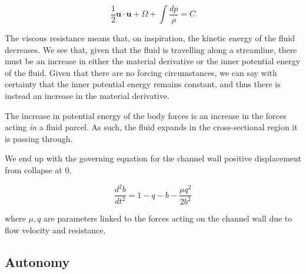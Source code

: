\documentclass{article}
\begin{document}
\begin{equation}
    \frac{1}{2}\mathbf{u}\cdot\mathbf{u} + \Omega + \int\frac{dp}{\rho} = C
    \label{eqn:bernoulli}
\end{equation}

The viscous resistance means that, on inspiration,
the kinetic energy of the fluid decreases.
We see that, given that the fluid is travelling along a streamline,
there must be an increase in either the material derivative or the inner potential energy of the fluid.
Given that there are no forcing circumstances,
we can say with certainty that the inner potential energy remains constant,
and thus there is instead an increase in the material derivative.

The increase in potential energy of the body forces is an increase in the forces acting \textit{in} a fluid parcel.
As such, the fluid expands in the cross-sectional region it is passing through.





We end up with the governing equation for the channel wall positive displacement from collapse at $0$,

\begin{equation}
    \frac{d^2b}{dt^2} = 1 - q - b - \frac{\mu q^2}{2b^2}
    \label{eqn:master}
\end{equation}

where $\mu, q$ are parameters linked to the forces acting on the channel wall due to flow velocity and resistance.


\subsection{Autonomy}
\end{document}

